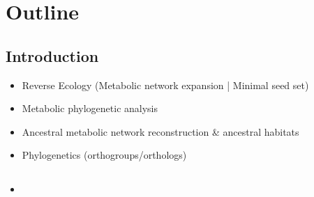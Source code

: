 \section*{Outline}

\subsection*{Introduction}
\begin{itemize}
    \item Reverse Ecology (Metabolic network expansion | Minimal seed set) 
    \item Metabolic phylogenetic analysis 
    \item Ancestral metabolic network reconstruction & ancestral habitats
    \item Phylogenetics (orthogroups/orthologs)
\end{itemize}

\subsection*{}
\begin{itemize}
    \item 
  \end{itemize}

